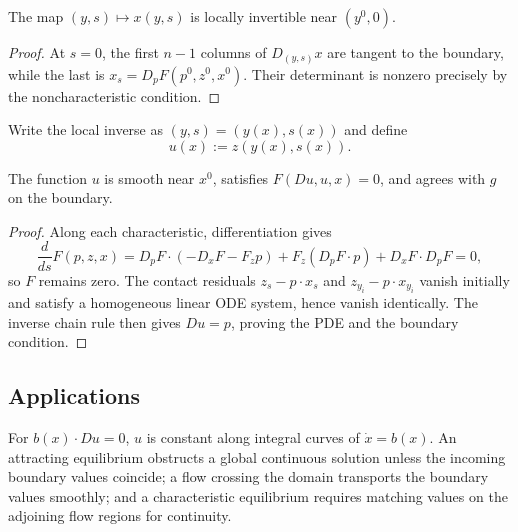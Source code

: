 \begin{lemma}
\label{lem:local-invertibility-characteristics}
The map $(y,s)\mapsto x(y,s)$ is locally invertible near $(y^0,0)$.
\end{lemma}

\begin{proof}
\sketch At $s=0$, the first $n-1$ columns of $D_{(y,s)}x$ are tangent to
the boundary, while the last is
$x_s=D_pF(p^0,z^0,x^0)$. Their determinant is nonzero precisely by the
noncharacteristic condition.
\end{proof}

Write the local inverse as $(y,s)=(y(x),s(x))$ and define
\[
u(x):=z(y(x),s(x)).
\]

\begin{theorem}
\label{thm:local-existence-characteristics}
The function $u$ is smooth near $x^0$, satisfies
$F(Du,u,x)=0$, and agrees with $g$ on the boundary.
\end{theorem}

\begin{proof}
\sketch Along each characteristic, differentiation gives
\[
\frac d{ds}F(p,z,x)=D_pF\cdot(-D_xF-F_zp)
+F_z(D_pF\cdot p)+D_xF\cdot D_pF=0,
\]
so $F$ remains zero. The contact residuals
$z_s-p\cdot x_s$ and $z_{y_i}-p\cdot x_{y_i}$ vanish initially and satisfy
a homogeneous linear ODE system, hence vanish identically. The inverse chain
rule then gives $Du=p$, proving the PDE and the boundary condition.
\end{proof}

\subsection{Applications}
\label{sec:characteristics-applications}

\begin{example}
\label{ex:linear-transport-characteristics-flow}
For $b(x)\cdot Du=0$, $u$ is constant along integral curves of $\dot x=b(x)$.
An attracting equilibrium obstructs a global continuous solution unless the
incoming boundary values coincide; a flow crossing the domain transports the
boundary values smoothly; and a characteristic equilibrium requires matching
values on the adjoining flow regions for continuity.
\end{example}

